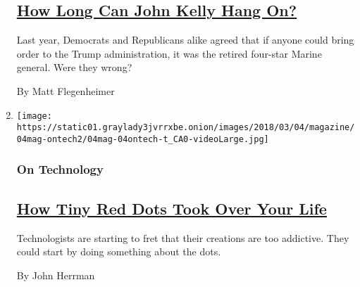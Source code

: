 \begin{enumerate}
  \hypertarget{how-long-can-john-kelly-hang-on}{%
  \subsection{\texorpdfstring{\href{/2018/02/26/magazine/how-long-can-john-kelly-hang-on.html}{How
  Long Can John Kelly Hang
  On?}}{How Long Can John Kelly Hang On?}}\label{how-long-can-john-kelly-hang-on}}

  Last year, Democrats and Republicans alike agreed that if anyone could
  bring order to the Trump administration, it was the retired four-star
  Marine general. Were they wrong?

  By Matt Flegenheimer
\item
  \texttt{[image: https://static01.graylady3jvrrxbe.onion/images/2018/03/04/magazine/04mag-ontech2/04mag-04ontech-t\_CA0-videoLarge.jpg]}

  \hypertarget{on-technology}{%
  \subsubsection{On Technology}\label{on-technology}}

  \hypertarget{how-tiny-red-dots-took-over-your-life}{%
  \subsection{\texorpdfstring{\href{/2018/02/27/magazine/red-dots-badge-phones-notification.html}{How
  Tiny Red Dots Took Over Your
  Life}}{How Tiny Red Dots Took Over Your Life}}\label{how-tiny-red-dots-took-over-your-life}}

  Technologists are starting to fret that their creations are too
  addictive. They could start by doing something about the dots.

  By John Herrman
\end{enumerate}

